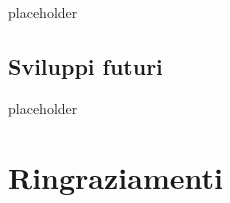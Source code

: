 \documentclass[a4paper,10pt]{memoir}
\begin{document}
placeholder

\clearpage

\section{Sviluppi futuri}

placeholder

\clearpage


\chapter*{Ringraziamenti}

\cleardoublepage


\end{document}

